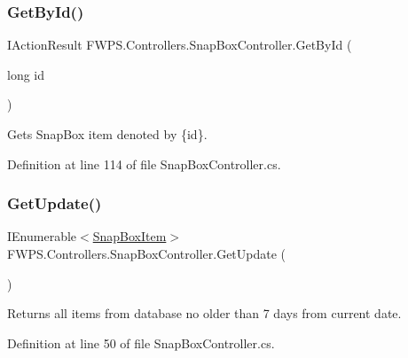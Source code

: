\subsubsection{\texorpdfstring{Get\+By\+Id()}{GetById()}}
{\footnotesize\ttfamily I\+Action\+Result F\+W\+P\+S.\+Controllers.\+Snap\+Box\+Controller.\+Get\+By\+Id (\begin{DoxyParamCaption}\item[{long}]{id }\end{DoxyParamCaption})}



Gets Snap\+Box item denoted by \{id\}. 



Definition at line 114 of file Snap\+Box\+Controller.\+cs.

\mbox{\label{class_f_w_p_s_1_1_controllers_1_1_snap_box_controller_a4b83e073156adc29992825eaed5f6a49}} 
\subsubsection{\texorpdfstring{Get\+Update()}{GetUpdate()}}
{\footnotesize\ttfamily I\+Enumerable$<$\mbox{\hyperlink{class_f_w_p_s_1_1_models_1_1_snap_box_item}{Snap\+Box\+Item}}$>$ F\+W\+P\+S.\+Controllers.\+Snap\+Box\+Controller.\+Get\+Update (\begin{DoxyParamCaption}{ }\end{DoxyParamCaption})}



Returns all items from database no older than 7 days from current date. 



Definition at line 50 of file Snap\+Box\+Controller.\+cs.

\mbox{\label{class_f_w_p_s_1_1_controllers_1_1_snap_box_controller_a6cb26790ddb2f4881b90be4b77350a7b}} 

